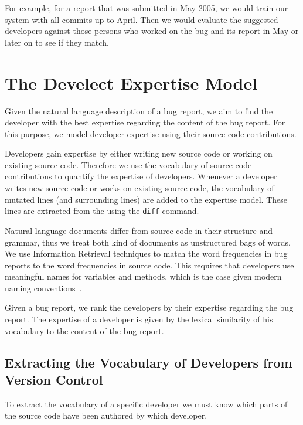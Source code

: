 For example, for a report that was submitted in May 2005, we would train our system with all commits up to April. Then we would evaluate the suggested developers against those persons who worked on the bug and its report in May or later on to see if they match.

 

\section{The Develect Expertise Model}\label{sec:algorithm}

Given the natural language description of a bug report, we aim to find the developer with the best expertise regarding the content of the bug report. For this purpose, we model developer expertise using their source code contributions. 

Developers gain expertise by either writing new source code or working on existing source code. Therefore we use the vocabulary of source code contributions to quantify the expertise of developers. Whenever a developer writes new source code or works on existing source code, the vocabulary of mutated lines (and surrounding lines) are added to the expertise model. These lines are extracted from the \VCS using the \verb$diff$ command.

Natural language documents differ from source code in their structure and grammar, thus we treat both kind of documents as unstructured bags of words. We use Information Retrieval techniques to match the word frequencies in bug reports to the word frequencies in source code. This requires that developers use meaningful names \eg for variables and methods, which is the case given modern naming conventions~\cite{Kuhn07a}. 

Given a bug report, we rank the developers by their expertise regarding the bug report. The expertise of a developer is given by the lexical similarity of his vocabulary to the content of the bug report.

\subsection{Extracting the Vocabulary of Developers from Version Control}

To extract the vocabulary of a specific developer we must know which parts of the source code have been authored by which developer. 

